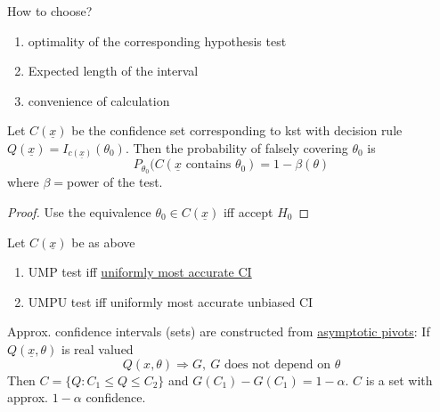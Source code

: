 \documentclass[english, 11pt]{article}
\begin{document}
How to choose?
\begin{enumerate}
\item optimality of the corresponding hypothesis test
\item Expected length of the interval
\item convenience of calculation
\end{enumerate}

\begin{thrm}\label{thrm:613}
Let $C(\underline{x})$ be the confidence set corresponding to kst with decision rule $Q(\underline{x})=I_{c(\underline{x})}(\theta_0)$. Then the probability of falsely covering $\theta_0$ is 
$$
P_{\theta_0}(C(\underline{x}\text{ contains }\theta_0)=1-\beta(\theta)
$$
where $\beta=$power of the test.
\end{thrm}
\begin{proof}
Use the equivalence $\theta_0\in C(\underline{x})$ iff accept $H_0$
\end{proof}

\begin{cor}\label{cor:614}
Let $C(\underline{x})$ be as above
\begin{enumerate}
\item UMP test iff \underline{uniformly most accurate CI}
\item UMPU test iff uniformly most accurate unbiased CI
\end{enumerate}
\end{cor}

\begin{defn}\label{defn:615}
Approx. confidence intervals (sets) are constructed from \underline{asymptotic pivots}: If $Q(\underline{x}, \theta)$ is real valued 
$$
Q(x, \theta)\Rightarrow G, ~G\text{ does not depend on }\theta
$$
Then $C=\{Q:C_1\leqslant Q\leqslant C_2\}$ and $G(C_1)-G(C_1)=1-\alpha$. $C$ is a set with approx. $1-\alpha$ confidence.
\end{defn}
\end{document}

